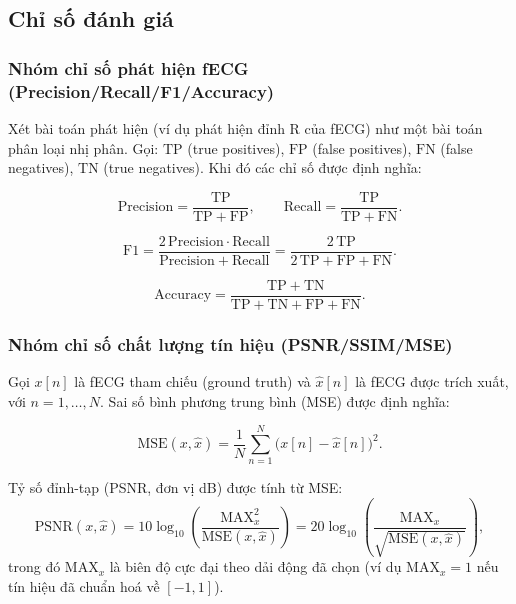 \documentclass[../DoAn.tex]{subfiles}
\begin{document}
\subsection{Chỉ số đánh giá}
\subsubsection{Nhóm chỉ số phát hiện fECG (Precision/Recall/F1/Accuracy)}
Xét bài toán phát hiện (ví dụ phát hiện đỉnh R của fECG) như một bài toán phân loại nhị phân. Gọi:
$\mathrm{TP}$ (true positives), $\mathrm{FP}$ (false positives),
$\mathrm{FN}$ (false negatives), $\mathrm{TN}$ (true negatives).
Khi đó các chỉ số được định nghĩa:

\begin{equation}
\mathrm{Precision} = \frac{\mathrm{TP}}{\mathrm{TP}+\mathrm{FP}},
\qquad
\mathrm{Recall} = \frac{\mathrm{TP}}{\mathrm{TP}+\mathrm{FN}}.
\end{equation}

\begin{equation}
\mathrm{F1} = \frac{2\,\mathrm{Precision}\cdot \mathrm{Recall}}{\mathrm{Precision}+\mathrm{Recall}}
           = \frac{2\,\mathrm{TP}}{2\,\mathrm{TP}+\mathrm{FP}+\mathrm{FN}}.
\end{equation}

\begin{equation}
\mathrm{Accuracy} = \frac{\mathrm{TP}+\mathrm{TN}}{\mathrm{TP}+\mathrm{TN}+\mathrm{FP}+\mathrm{FN}}.
\end{equation}

\subsubsection{Nhóm chỉ số chất lượng tín hiệu (PSNR/SSIM/MSE)}
Gọi $x[n]$ là fECG tham chiếu (ground truth) và $\hat{x}[n]$ là fECG được trích xuất, với $n=1,\dots,N$.
Sai số bình phương trung bình (MSE) được định nghĩa:

\begin{equation}
\mathrm{MSE}(x,\hat{x})=\frac{1}{N}\sum_{n=1}^{N}\big(x[n]-\hat{x}[n]\big)^2 .
\end{equation}

Tỷ số đỉnh-tạp (PSNR, đơn vị dB) được tính từ MSE:
\begin{equation}
\mathrm{PSNR}(x,\hat{x}) = 10\log_{10}\left(\frac{\mathrm{MAX}_x^2}{\mathrm{MSE}(x,\hat{x})}\right)
=20\log_{10}\left(\frac{\mathrm{MAX}_x}{\sqrt{\mathrm{MSE}(x,\hat{x})}}\right),
\end{equation}
trong đó $\mathrm{MAX}_x$ là biên độ cực đại theo dải động đã chọn (ví dụ $\mathrm{MAX}_x=1$ nếu tín hiệu đã chuẩn hoá về $[-1,1]$).
\end{document}
